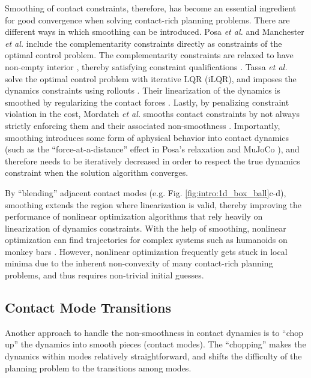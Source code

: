 Smoothing of contact constraints, therefore, has become an essential ingredient for good convergence when solving contact-rich planning problems. There are different ways in which smoothing can be introduced. Posa \textit{et al.}  and Manchester \textit{et al.} include the complementarity constraints directly as constraints of the optimal control problem. The complementarity constraints are relaxed to have non-empty interior \cite{posa2014direct, manchester2020variational}, thereby satisfying constraint qualifications \cite[]{nocedal1999numerical}. Tassa \textit{et al.} solve the optimal control problem with iterative LQR (iLQR), and imposes the dynamics constraints using rollouts \cite{tassa2012synthesis}. Their linearization of the dynamics is smoothed by regularizing the contact forces \cite{todorov2012mujoco}. Lastly, by penalizing constraint violation in the cost, Mordatch \textit{et al.} smooths contact constraints by not always strictly enforcing them and their associated non-smoothness \cite{mordatch2012contact}. Importantly, smoothing introduces some form of aphysical behavior into contact dynamics (such as the ``force-at-a-distance'' effect in Posa's relaxation \cite{posa2014direct} and MuJoCo \cite{kolbert2016experimental}), and therefore needs to be iteratively decreased in order to respect the true dynamics constraint when the solution algorithm converges.

By ``blending'' adjacent contact modes (e.g. Fig. \ref{fig:intro:1d_box_ball}c-d), smoothing extends the region where linearization is valid, thereby improving the performance of nonlinear optimization algorithms that rely heavily on linearization of dynamics constraints. With the help of smoothing, nonlinear optimization can find trajectories for complex systems such as humanoids on monkey bars \cite{dai2014whole}. However, nonlinear optimization frequently gets stuck in local minima due to the inherent non-convexity of many contact-rich planning problems, and thus requires non-trivial initial guesses.

\subsection{Contact Mode Transitions}
Another approach to handle the non-smoothness in contact dynamics is to ``chop up'' the dynamics into smooth pieces (contact modes). The ``chopping'' makes the dynamics within modes relatively straightforward, and shifts the difficulty of the planning problem to the transitions among modes. 

